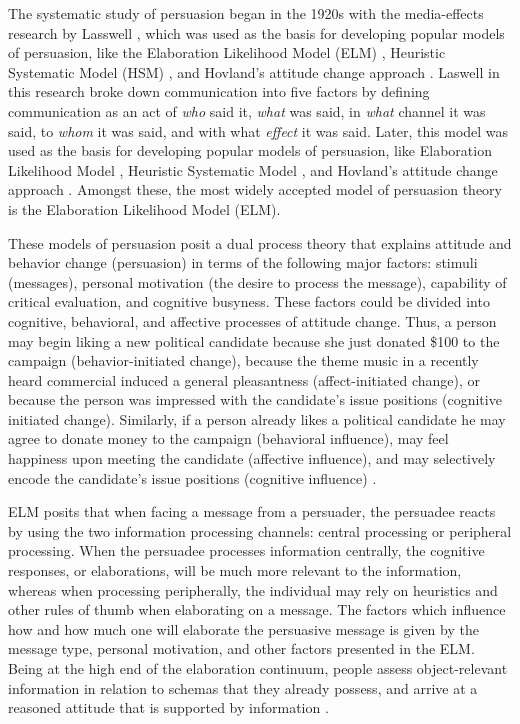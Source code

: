 The systematic study of persuasion began in the 1920s with the media-effects research by Lasswell \cite{lasswell1971propaganda}, which was used as the basis for developing popular models of persuasion, like the Elaboration Likelihood Model (ELM) \cite{petty1986elaboration}, Heuristic Systematic Model (HSM) \cite{chaiken1980heuristic}, and Hovland's attitude change approach \cite{hovland1953communication}. %
Laswell in this research broke down communication into five factors by defining communication as an act of \textit{who} said it, \textit{what} was said, in \textit{what} channel it was said, to \textit{whom} it was said, and with what \textit{effect} it was said. Later, this model was used as the basis for developing popular models of persuasion, like Elaboration Likelihood Model \cite{petty1986elaboration}, Heuristic Systematic Model \cite{chaiken1980heuristic}, and Hovland's attitude change approach \cite{hovland1953communication}. Amongst these, the most widely accepted model of persuasion theory is the Elaboration Likelihood Model (ELM). 

These models of persuasion posit a dual process theory that explains attitude and behavior change (persuasion) in terms of the following major factors: stimuli (messages), personal motivation (the desire to process the message), capability of critical evaluation, and cognitive busyness. These factors could be divided into cognitive, behavioral, and affective processes of attitude change. 
Thus, a person may begin liking a new political candidate because she just donated \$100 to the campaign (behavior-initiated change), because the theme music in a recently heard commercial induced a general pleasantness (affect-initiated change), or because the person was impressed with the candidate’s issue positions (cognitive initiated change). Similarly, if a person already likes a political candidate he may agree to donate money to the campaign (behavioral influence), may feel happiness upon meeting the candidate (affective influence), and may selectively encode the candidate’s issue positions (cognitive influence) \cite{petty1986elaboration}.

ELM posits that when facing a message from a persuader, the persuadee reacts by using the two information processing channels: central processing or peripheral processing. When the persuadee processes information centrally, the cognitive responses, or elaborations, will be much more relevant to the information, whereas when processing peripherally, the individual may rely on heuristics and other rules of thumb when elaborating on a message. The factors which influence how and how much one will elaborate the persuasive message is given by the message type, personal motivation, and other factors presented in the ELM. Being at the high end of the elaboration continuum, people assess object-relevant information in relation to schemas that they already possess, and arrive at a reasoned attitude that is supported by information \cite{van2011handbook}. 


